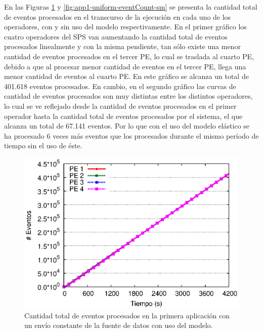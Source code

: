 En las Figuras \ref{fig:app1-uniform-eventCount-cm} y \ref{fig:app1-uniform-eventCount-sm} se presenta la cantidad total de eventos procesados en el transcurso de la ejecuci\'on en cada uno de los operadores, con y sin uso del modelo respectivamente. En el primer gr\'afico los cuatro operadores del SPS van aumentando la cantidad total de eventos procesados linealmente y con la misma pendiente, tan s\'olo existe una menor cantidad de eventos procesados en el tercer PE, lo cual se traslada al cuarto PE, debido a que al procesar menor cantidad de eventos en el tercer PE, llega una menor cantidad de eventos al cuarto PE. En este gr\'afico se alcanza un total de 401.618 eventos procesados. En cambio, en el segundo gr\'afico las curvas de cantidad de eventos procesados son muy distintas entre los distintos operadores, lo cual se ve reflejado desde la cantidad de eventos procesados en el primer operador hasta la cantidad total de eventos procesados por el sistema, el que alcanza un total de 67.141 eventos. Por lo que con el uso del modelo el\'astico se ha procesado 6 veces m\'as eventos que los procesados durante el mismo per\'iodo de tiempo sin el uso de \'este.

\begin{figure}[!ht]
	\centering
    \includegraphics[scale=0.7]{images/exp/app1/uniform/cm/eventCount.eps}
    \caption{Cantidad total de eventos procesados en la primera aplicaci\'on con un env\'io constante de la fuente de datos con uso del modelo.}
    \label{fig:app1-uniform-eventCount-cm}
\end{figure}

